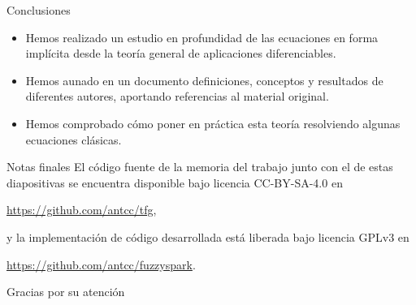 \documentclass[10pt, spanish]{beamer}
\begin{document}
\begin{frame}{Conclusiones}
  \begin{itemize}
  \item Hemos realizado un estudio en profundidad de las ecuaciones en forma implícita desde la teoría general de aplicaciones diferenciables.
  \item Hemos aunado en un documento definiciones, conceptos y resultados de diferentes autores, aportando referencias al material original.
  \item Hemos comprobado cómo poner en práctica esta teoría resolviendo algunas ecuaciones clásicas.
\end{itemize}
\end{frame}

\begin{frame}{Notas finales}
El código fuente de la memoria del trabajo junto con el de estas diapositivas se encuentra disponible bajo licencia CC-BY-SA-4.0 en
\begin{center}
\url{https://github.com/antcc/tfg},
\end{center}

y la implementación de código desarrollada está liberada bajo licencia GPLv3 en
\begin{center}
\url{https://github.com/antcc/fuzzyspark}.
\end{center}

\end{frame}

\begin{frame}[standout]
Gracias por su atención
\end{frame}
\end{document}
